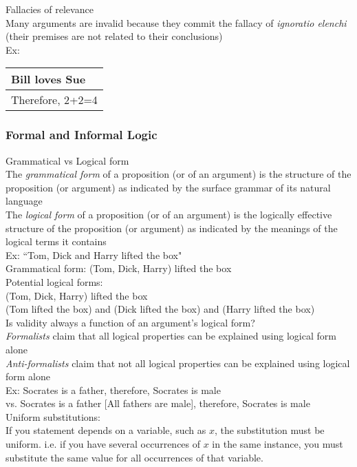 Fallacies of relevance\\
Many arguments are invalid because they commit the fallacy of \textit{ignoratio elenchi} (their premises are not related to their conclusions)\\
Ex:\\
\begin{tabular}{p{4cm}}
    Bill loves Sue\\
    \hline
    Therefore, 2+2=4
\end{tabular}

\subsubsection{Formal and Informal Logic}

Grammatical vs Logical form\\
The \textit{grammatical form} of a proposition (or of an argument) is the structure of the proposition (or argument) as indicated by the surface grammar of its natural language\\
The \textit{logical form} of a proposition (or of an argument) is the logically effective structure of the proposition (or argument) as indicated by the meanings of the logical terms it contains\\
Ex: ``Tom, Dick and Harry lifted the box"\\
Grammatical form: (Tom, Dick, Harry) lifted the box\\
Potential logical forms:\\
(Tom, Dick, Harry) lifted the box\\
(Tom lifted the box) and (Dick lifted the box) and (Harry lifted the box)\\

Is validity always a function of an argument's logical form?\\
\textit{Formalists} claim that all logical properties can be explained using logical form alone\\
\textit{Anti-formalists} claim that not all logical properties can be explained using logical form alone\\
Ex: Socrates is a father, therefore, Socrates is male\\
vs. Socrates is a father [All fathers are male], therefore, Socrates is male\\

Uniform substitutions:\\
If you statement depends on a variable, such as $x$, the substitution must be uniform. i.e. if you have several occurrences of $x$ in the same instance, you must substitute the same value for all occurrences of that variable.\\

